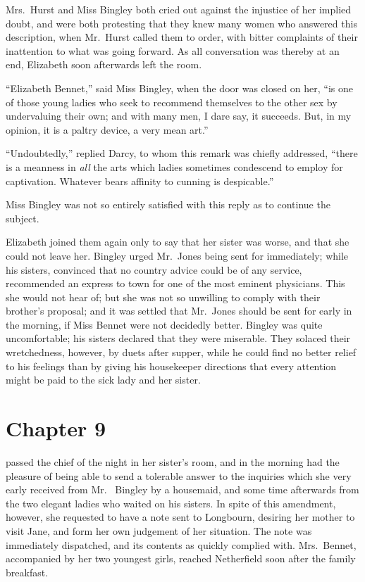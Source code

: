 Mrs.\ Hurst and Miss Bingley both cried out against the injustice
of her implied doubt, and were both protesting that they knew
many women who answered this description, when Mr.\ Hurst
called them to order, with bitter complaints of their inattention
to what was going forward.  As all conversation was thereby at
an end, Elizabeth soon afterwards left the room.

``Elizabeth Bennet,'' said Miss Bingley, when the door was
closed on her, ``is one of those young ladies who seek to
recommend themselves to the other sex by undervaluing their
own; and with many men, I dare say, it succeeds.  But, in my
opinion, it is a paltry device, a very mean art.''

``Undoubtedly,'' replied Darcy, to whom this remark was chiefly
addressed, ``there is a meanness in \emph{all} the arts which ladies
sometimes condescend to employ for captivation.  Whatever
bears affinity to cunning is despicable.''

Miss Bingley was not so entirely satisfied with this reply as to
continue the subject.

Elizabeth joined them again only to say that her sister was worse,
and that she could not leave her.  Bingley urged Mr.\ Jones being
sent for immediately; while his sisters, convinced that no country
advice could be of any service, recommended an express to town for
one of the most eminent physicians.  This she would not hear of;
but she was not so unwilling to comply with their brother's
proposal; and it was settled that Mr.\ Jones should be sent for
early in the morning, if Miss Bennet were not decidedly better.
Bingley was quite uncomfortable; his sisters declared that they
were miserable.  They solaced their wretchedness, however, by
duets after supper, while he could find no better relief to his
feelings than by giving his housekeeper directions that every
attention might be paid to the sick lady and her sister.



\chapter{Chapter 9}


 passed the chief of the night in her sister's room, and
in the morning had the pleasure of being able to send a tolerable
answer to the inquiries which she very early received from Mr.\ %
Bingley by a housemaid, and some time afterwards from the two
elegant ladies who waited on his sisters.  In spite of this
amendment, however, she requested to have a note sent to Longbourn,
desiring her mother to visit Jane, and form her own judgement of
her situation.  The note was immediately dispatched, and its
contents as quickly complied with.  Mrs.\ Bennet, accompanied by
her two youngest girls, reached Netherfield soon after the family
breakfast.

